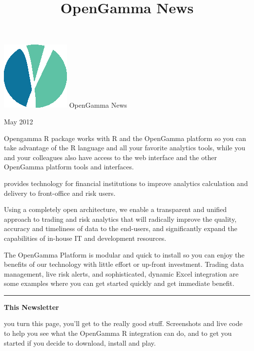 \documentclass[custom, plainsections]{sciposter}
\title{OpenGamma News}
\begin{document}
\rmfamily

\begin{megasize}
\includegraphics{og-device.eps}
\hspace{0.3in}
OpenGamma News
\end{megasize} \hfill May 2012

\vspace{0.5cm}

\setlength\columnseprule{0pt}

\begin{multicols*}{3}

\small

 Opengamma R package works with R and the OpenGamma platform so you can take advantage of the R language and all your favorite analytics tools, while you and your colleagues also have access to the web interface and the other OpenGamma platform tools and interfaces.

 provides technology for financial institutions to improve analytics calculation and delivery to front-office and risk users.

Using a completely open architecture, we enable a transparent and unified approach to trading and risk analytics that will radically improve the quality, accuracy and timeliness of data to the end-users, and significantly expand the capabilities of in-house IT and development resources.

The OpenGamma Platform is modular and quick to install so you can enjoy the benefits of our technology with little effort or up-front investment. Trading data management, live risk alerts, and sophisticated, dynamic Excel integration are some examples where you can get started quickly and get immediate benefit.

\vspace{0.5cm}
\hrule
\vspace{0.5cm}

\textbf{This Newsletter}

 you turn this page, you'll get to the really good stuff. Screenshots and live code to help you see what the OpenGamma R integration can do, and to get you started if you decide to download, install and play.


\end{multicols*}
\end{document}
